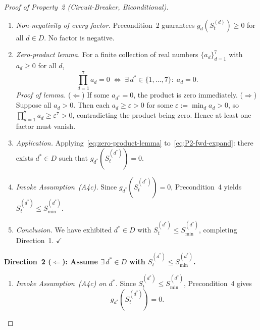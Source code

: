 \documentclass[12pt,openany]{book}
\numberwithin{equation}{chapter}
\theoremstyle{plain}
\theoremstyle{definition}
\theoremstyle{remark}
\def\mathcal#1{#1}%
\begin{document}
\begin{proof}[Proof of Property~2 (Circuit-Breaker, Biconditional)]
\begin{enumerate}
  \item \emph{Non-negativity of every factor.}
        Precondition~2 guarantees
        $g_d\!\left(\mathcal{S}_t^{(d)}\right) \geq 0$
        for all $d\in\mathcal{D}$.  No factor is negative.

  \item \emph{Zero-product lemma.}
        For a finite collection of real numbers
        $\{a_d\}_{d=1}^{7}$ with $a_d \geq 0$ for all $d$,
        \begin{equation}
          \prod_{d=1}^{7} a_d = 0
          \;\Longleftrightarrow\;
          \exists\, d^* \in \{1,\dots,7\}:\; a_d = 0.
          \label{eq:zero-product-lemma}
        \end{equation}
        \emph{Proof of lemma.}
        ($\Leftarrow$) If some $a_{d^*}=0$, the product is
        zero immediately.
        ($\Rightarrow$) Suppose all $a_d > 0$.  Then each
        $a_d \geq \varepsilon > 0$ for some
        $\varepsilon := \min_d a_d > 0$, so
        $\prod_{d=1}^7 a_d \geq \varepsilon^7 > 0$,
        contradicting the product being zero.
        Hence at least one factor must vanish.

  \item \emph{Application.}
        Applying~\eqref{eq:zero-product-lemma}
        to~\eqref{eq:P2-fwd-expand}: there exists
        $d^*\in\mathcal{D}$ such that
        $g_{d^*}\!\left(\mathcal{S}_t^{(d^*)}\right) = 0$.

  \item \emph{Invoke Assumption~(A4c).}
        Since $g_{d^*}\!\left(\mathcal{S}_t^{(d^*)}\right)=0$,
        Precondition~4 yields
        $\mathcal{S}_t^{(d^*)} \leq \mathcal{S}_{\min}^{(d^*)}$.

  \item \emph{Conclusion.}
        We have exhibited $d^*\in\mathcal{D}$ with
        $\mathcal{S}_t^{(d^*)} \leq \mathcal{S}_{\min}^{(d^*)}$,
        completing Direction~1. \hfill$\checkmark$
\end{enumerate}

\medskip
\noindent
\textbf{Direction~2 ($\Leftarrow$): Assume $\exists\,d^*\in
\mathcal{D}$ with $\mathcal{S}_t^{(d^*)}\leq
\mathcal{S}_{\min}^{(d^*)}$.}
\begin{enumerate}
  \item \emph{Invoke Assumption~(A4c) on $d^*$.}
        Since $\mathcal{S}_t^{(d^*)}\leq\mathcal{S}_{\min}^{(d^*)}$,
        Precondition~4 gives
        \begin{equation}
          g_{d^*}\!\left(\mathcal{S}_t^{(d^*)}\right) = 0.
          \label{eq:P2-bwd-zero}
        \end{equation}


\end{enumerate}
\end{proof}
\end{document}
